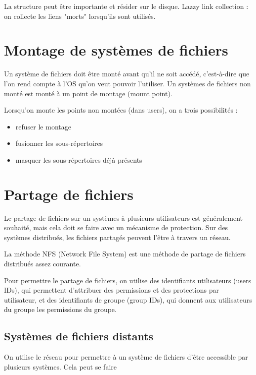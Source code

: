 		La structure peut être importante et résider sur le disque. Lazzy link collection : on collecte les liens "morts" lorsqu'ils sont utilisés.
		
		
\section{Montage de systèmes de fichiers}

Un système de fichiers doit être monté avant qu'il ne soit accédé, c'est-à-dire que l'on rend compte à l'OS qu'on veut pouvoir l'utiliser. Un systèmes de fichiers non monté est monté à un point de montage (mount point).


Lorsqu'on monte les points non montées (dans users), on a trois possibilités :

\begin{itemize}
	\item refuser le montage
	\item fusionner les sous-répertoires
	\item masquer les sous-répertoires déjà présents
\end{itemize}

\section{Partage de fichiers}

Le partage de fichiers sur un systèmes à plusieurs utilisateurs est généralement souhaité, mais cela doit se faire avec un mécanisme de protection. Sur des systèmes distribués, les fichiers partagés peuvent l'être à travers un réseau. 

La méthode NFS (Network File System) est une méthode de partage de fichiers distribués assez courante.

Pour permettre le partage de fichiers, on utilise des identifiants utilisateurs (users IDs), qui permettent d'attribuer des permissions et des protections par utilisateur, et des identifiants de groupe (group IDs), qui donnent aux utilisateurs du groupe les permissions du groupe.

	\subsection{Systèmes de fichiers distants}
	
	On utilise le réseau pour permettre à un système de fichiers d'être accessible par plusieurs systèmes. Cela peut se faire
	
